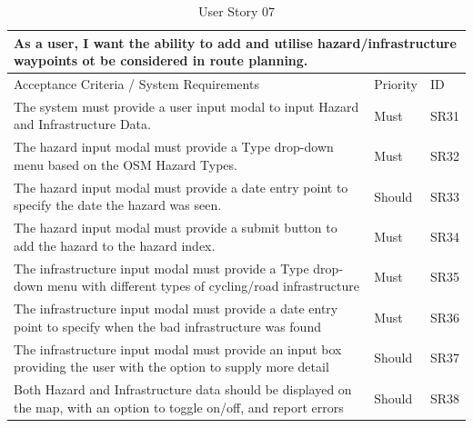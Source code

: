 \begin{table}[!htb]
\caption{User Story 07}
\label{tab:user-story-07}
\begin{tabular}{ p{8cm} p{1cm}  p{1cm} }
\hline
\multicolumn{3}{p{13cm}}{As a user, I want the ability to add and utilise hazard/infrastructure waypoints ot be considered in route planning.}\\ 
\hline
Acceptance Criteria / System Requirements & Priority & ID\\
\hline
The system must provide a user input modal to input Hazard and Infrastructure Data. & Must & SR31 \\
The hazard input modal must provide a Type drop-down menu based on the OSM Hazard Types. & Must & SR32\\
The hazard input modal must provide a date entry point to specify the date the hazard was seen. & Should & SR33\\
The hazard input modal must provide a submit button to add the hazard to the hazard index. & Must & SR34\\
The infrastructure input modal must provide a Type drop-down menu with different types of cycling/road infrastructure & Must & SR35\\
The infrastructure input modal must provide a date entry point to specify when the bad infrastructure was found & Must & SR36\\
The infrastructure input modal must provide an input box providing the user with the option to supply more detail & Should & SR37\\
Both Hazard and Infrastructure data should be displayed on the map, with an option to toggle on/off, and report errors & Should & SR38\\
\hline
\end{tabular}
\end{table}
